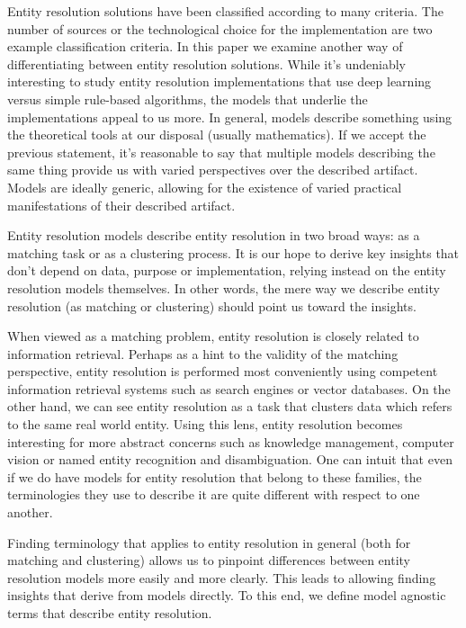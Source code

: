 \documentclass[journal]{IEEEtran}
\begin{document}
    Entity resolution solutions have been classified according to many criteria.
    The number of sources or the technological choice for the implementation are
    two example classification criteria.
    In this paper we examine another way of differentiating between entity
    resolution solutions.
    While it's undeniably interesting to study entity resolution implementations
    that use deep learning versus simple rule-based algorithms, the models that
    underlie the implementations appeal to us more.
    In general, models describe something using the theoretical tools at our
    disposal (usually mathematics).
    If we accept the previous statement, it's reasonable to say that multiple
    models describing the same thing provide us with varied perspectives over
    the described artifact.
    Models are ideally generic, allowing for the existence of varied practical
    manifestations of their described artifact.
    
    Entity resolution models describe entity resolution in two broad ways: as a
    matching task or as a clustering process.
    It is our hope to derive key insights that don't depend on data, purpose or
    implementation, relying instead on the entity resolution models themselves.
    In other words, the mere way we describe entity resolution (as matching or
    clustering) should point us toward the insights.

    When viewed as a matching problem, entity resolution is closely related to
    information retrieval.
    Perhaps as a hint to the validity of the matching perspective, entity
    resolution is performed most conveniently using competent information
    retrieval systems such as search engines or vector databases.
    On the other hand, we can see entity resolution as a task that clusters data
    which refers to the same real world entity.
    Using this lens, entity resolution becomes interesting for more abstract
    concerns such as knowledge management, computer vision or named entity
    recognition and disambiguation.
    One can intuit that even if we do have models for entity resolution that
    belong to these families, the terminologies they use to describe it are
    quite different with respect to one another.

    Finding terminology that applies to entity resolution in general (both for
    matching and clustering) allows us to pinpoint differences between entity
    resolution models more easily and more clearly.
    This leads to allowing finding insights that derive from models directly.
    To this end, we define model agnostic terms that describe entity resolution.
    
\end{document}
